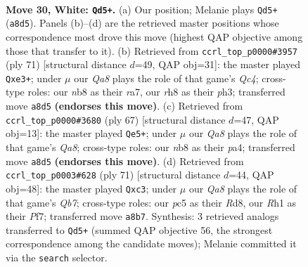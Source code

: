 \documentclass[11pt]{article}
\begin{document}
\clearpage

\begin{figure}[p]\centering
\begin{subfigure}{0.46\textwidth}\centering
\resizebox{\linewidth}{!}{%
\newchessgame
\chessboard[
  setfen={Qn5r/5k2/1p1p4/pPp5/4P3/7P/qP4P1/2K4R w - - 0 30},
  showmover=false,
  pgfstyle=straightmove, color=movearrow, markmove={a8-d5}
]}
\caption{}
\end{subfigure}\hfill
\begin{subfigure}{0.46\textwidth}\centering
\resizebox{\linewidth}{!}{%
\newchessgame
\chessboard[
  setfen={3r3k/R2P1Qpp/5p2/2q1p3/1p6/3PP2P/6P1/6K1 b - - 2 36},
  showmover=false,
  pgfstyle=straightmove, color=movearrow, markmove={c5-e3}
]}
\caption{}
\end{subfigure}
\\[4pt]
\begin{subfigure}{0.46\textwidth}\centering
\resizebox{\linewidth}{!}{%
\newchessgame
\chessboard[
  setfen={4r1k1/3R3p/2p2ppQ/p7/P7/1P5P/6PK/q7 b - - 0 34},
  showmover=false,
  pgfstyle=straightmove, color=movearrow, markmove={a1-e5}
]}
\caption{}
\end{subfigure}\hfill
\begin{subfigure}{0.46\textwidth}\centering
\resizebox{\linewidth}{!}{%
\newchessgame
\chessboard[
  setfen={3r2k1/5pp1/7p/3p4/Q3p3/2P3P1/1qNRK2P/8 b - - 1 36},
  showmover=false,
  pgfstyle=straightmove, color=movearrow, markmove={b2-c3}
]}
\caption{}
\end{subfigure}
\caption{\textbf{Move 30, White: \texttt{Qd5+}.} (a) Our position; Melanie plays \texttt{Qd5+} (\texttt{a8d5}). Panels (b)--(d) are the retrieved master positions whose correspondence most drove this move (highest QAP objective among those that transfer to it). (b) Retrieved from \texttt{ccrl\_top\_p0000\#3957} (ply 71) [structural distance $d$=49, QAP obj=31]: the master played \texttt{Qxe3+}; under $\mu$ our \emph{Qa8} plays the role of that game's \emph{Qc4}; cross-type roles: our \emph{n}b8 as their \emph{r}a7, our \emph{r}h8 as their \emph{p}h3; transferred move \texttt{a8d5} \textbf{(endorses this move)}. (c) Retrieved from \texttt{ccrl\_top\_p0000\#3680} (ply 67) [structural distance $d$=47, QAP obj=13]: the master played \texttt{Qe5+}; under $\mu$ our \emph{Qa8} plays the role of that game's \emph{Qa8}; cross-type roles: our \emph{n}b8 as their \emph{p}a4; transferred move \texttt{a8d5} \textbf{(endorses this move)}. (d) Retrieved from \texttt{ccrl\_top\_p0003\#628} (ply 71) [structural distance $d$=44, QAP obj=48]: the master played \texttt{Qxc3}; under $\mu$ our \emph{Qa8} plays the role of that game's \emph{Qb7}; cross-type roles: our \emph{p}c5 as their \emph{R}d8, our \emph{R}h1 as their \emph{P}f7; transferred move \texttt{a8b7}. Synthesis: 3 retrieved analogs transferred to \texttt{Qd5+} (summed QAP objective 56, the strongest correspondence among the candidate moves); Melanie committed it via the \texttt{search} selector.}
\label{fig:thought-m58}
\end{figure}
\end{document}
